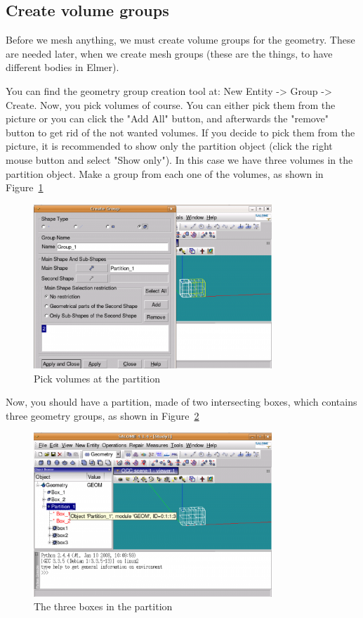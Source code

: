 \subsection{Create volume groups}

Before we mesh anything, we must create volume groups for the geometry. These are needed later, when we create mesh groups (these are the things, to have different bodies in Elmer).

You can find the geometry group creation tool at: New Entity -> Group -> Create. Now, you pick volumes of course. You can either pick them from the picture or you can click the "Add All" button, and afterwards the "remove" button to get rid of the not wanted volumes. If you decide to pick them from the picture, it is recommended to show only the partition object (click the right mouse button and select "Show only"). In this case we have three volumes in the partition object. Make a group from each one of the volumes, as shown in Figure~\ref{fg:salome-3}

\begin{figure}[H]
\centering
\includegraphics[width=0.8\textwidth]{Salome-3-pickvolumes}
\caption{Pick volumes at the partition}\label{fg:salome-3}
\end{figure}

Now, you should have a partition, made of two intersecting boxes, which contains three geometry groups, as shown in Figure~\ref{fg:salome-4}

\begin{figure}[H]
\centering
\includegraphics[width=0.8\textwidth]{Salome-4-geometrymodule}
\caption{The three boxes in the partition}\label{fg:salome-4}
\end{figure}

